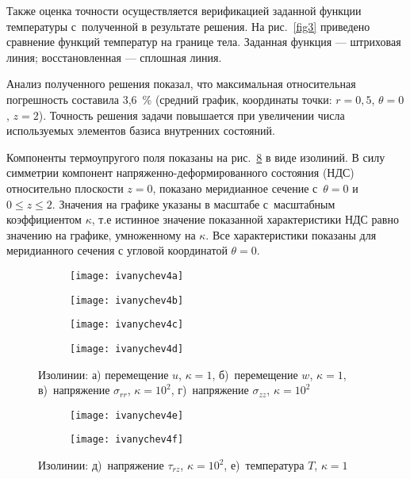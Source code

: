 \documentclass[press]{vestnik}
\begin{document}
Также оценка точности осуществляется верификацией заданной функции 
температуры с~полученной в результате решения. На рис.~\ref{fig3} приведено 
сравнение функций температур на границе тела. Заданная функция --- штриховая 
линия; восстановленная --- сплошная линия.

Анализ полученного решения показал, что максимальная относительная 
погрешность составила 3,6~{\%} (средний график, координаты точки: 
$r=0,5$, $\theta =0$, $z=2$). Точность решения задачи повышается при увеличении 
числа используемых элементов базиса внутренних состояний.

Компоненты термоупругого поля показаны на рис.~\ref{fig4} в виде изолиний. В силу симметрии компонент напряженно-деформированного состояния (НДС) относительно плоскости $z = 0$, показано меридианное сечение с~$\theta =0$ и $0\leqslant z\leqslant 2$. Значения на графике указаны в масштабе с~масштабным коэффициентом $\kappa $, т.е истинное значение показанной характеристики НДС равно значению на графике, умноженному на $\kappa $. Все характеристики показаны 
для меридианного сечения с угловой координатой $\theta =0$.

\begin{figure}[t!]
\centering
\begin{subfigure}{.39\textwidth}
\texttt{[image: ivanychev4a]}
\caption{}
\label{fig4a}
\end{subfigure}
\qquad
\begin{subfigure}{.39\textwidth}
\texttt{[image: ivanychev4b]}
\caption{}
\label{fig4b}
\end{subfigure}
\begin{subfigure}{.39\textwidth}
\texttt{[image: ivanychev4c]}
\caption{}
\label{fig4c}
\end{subfigure}
\qquad
\begin{subfigure}{.39\textwidth}
\texttt{[image: ivanychev4d]}
\caption{}
\label{fig4d}
\end{subfigure}
\caption{Изолинии: а) перемещение $u$, $\kappa =1$, б)~перемещение $w$, $\kappa 
=1$, в)~напряжение $\sigma_{rr}$, $\kappa =10^{2}$, г)~напряжение $\sigma 
_{zz}$, $\kappa =10^{2}$}
\label{fig4}
\end{figure}

\addtocounter{figure}{-1}
\begin{figure}
\centering
\begin{subfigure}{.39\textwidth}
\addtocounter{subfigure}{4}
\texttt{[image: ivanychev4e]}
\caption{}
\label{fig4e}
\end{subfigure}
\qquad
\begin{subfigure}{.39\textwidth}
\texttt{[image: ivanychev4f]}
\caption{}
\label{fig4f}
\end{subfigure}
\caption{Изолинии: д)~напряжение $\tau_{rz}$, $\kappa =10^{2}$, е)~температура $T$, $\kappa =1$}
\label{fig4}
\end{figure}
\end{document}
